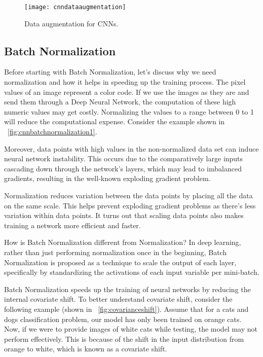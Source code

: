 	\begin{figure}[tbh]
		\centering
		\texttt{[image: cnndataaugmentation]}
		\caption[Data augmentation for CNNs]{Data augmentation for CNNs.}
		\label{fig:cnndataaugmentation}
	\end{figure}

	\subsection{Batch Normalization}
	\begin{bulletedlist}
		\item Before starting with Batch Normalization, let's discuss why we need normalization and how it helps in speeding up the training process.  The pixel values of an image represent a color code. If we use the images as they are and send them through a Deep Neural Network, the computation of these high numeric values may get costly. Normalizing the values to a range between 0 to 1 will reduce the computational expense.  Consider the example shown in \figurename~\ref{fig:cnnbatchnormalization1}.
		\item Moreover, data points with high values in the non-normalized data set can induce neural network instability. This occurs due to the comparatively large inputs cascading down through the network's layers, which may lead to imbalanced gradients, resulting in the well-known exploding gradient problem.
		\item Normalization reduces variation between the data points by placing all the data on the same scale. This helps prevent exploding gradient problems as there's less variation within data points.  It turns out that scaling data points also makes training a network more efficient and faster.
		\item How is Batch Normalization different from Normalization?  In deep learning, rather than just performing normalization once in the beginning, Batch Normalization is proposed as a technique to scale the output of each layer, specifically by standardizing the activations of each input variable per mini-batch.
		\item Batch Normalization speeds up the training of neural networks by reducing the internal covariate shift.  To better understand covariate shift, consider the following example (shown in \figurename~\ref{fig:covarianceshift}).  Assume that for a cats and dogs classification problem, our model has only been trained on orange cats.  Now, if we were to provide images of white cats while testing, the model may not perform effectively.  This is because of the shift in the input distribution from orange to white, which is known as a covariate shift.

\end{bulletedlist}
